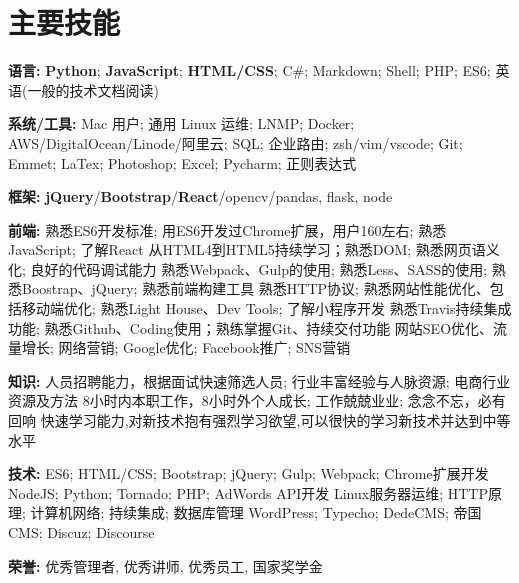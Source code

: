 \section{\textbf{主要技能}}
\resumeSubHeadingListStart
\item{
  \textbf{语言:}{ \textbf{Python}; \textbf{JavaScript}; \textbf{HTML/CSS}; C\#; Markdown; Shell; PHP; ES6; 英语(一般的技术文档阅读)}
}
\item{
 \textbf{系统/工具:}{ Mac 用户; 通用 Linux 运维; LNMP; Docker; AWS/DigitalOcean/Linode/阿里云; SQL; 企业路由; zsh/vim/vscode; Git; Emmet; LaTex; Photoshop; Excel; Pycharm; 正则表达式}
}
\item{
 \textbf{框架:}{ \textbf{jQuery}/\textbf{Bootstrap}/\textbf{React}/opencv/pandas, flask, node}
}
\item{
  \textbf{前端:}{
    \resumeItemListStart
       {熟悉ES6开发标准; 用ES6开发过Chrome扩展，用户160左右; 熟悉JavaScript; 了解React}
       {从HTML4到HTML5持续学习；熟悉DOM; 熟悉网页语义化; 良好的代码调试能力}
       {熟悉Webpack、Gulp的使用; 熟悉Less、SASS的使用; 熟悉Boostrap、jQuery; 熟悉前端构建工具}
       {熟悉HTTP协议; 熟悉网站性能优化、包括移动端优化; 熟悉Light House、Dev Tools; 了解小程序开发}
       {熟悉Travis持续集成功能; 熟悉Github、Coding使用；熟练掌握Git、持续交付功能}
       {网站SEO优化、流量增长; 网络营销; Google优化; Facebook推广; SNS营销}
   \resumeItemListEnd
  }
}
\item{
  \textbf{知识:}{
    \resumeItemListStart
       {人员招聘能力，根据面试快速筛选人员; 行业丰富经验与人脉资源; 电商行业资源及方法}
       {8小时内本职工作，8小时外个人成长; 工作兢兢业业; 念念不忘，必有回响}
       {快速学习能力,对新技术抱有强烈学习欲望,可以很快的学习新技术并达到中等水平}
   \resumeItemListEnd
  }
}
\item{
  \textbf{技术:}{
    \resumeItemListStart
       {ES6; HTML/CSS; Bootstrap; jQuery; Gulp; Webpack; Chrome扩展开发}
       {NodeJS; Python; Tornado; PHP; AdWords API开发}
       {Linux服务器运维; HTTP原理; 计算机网络; 持续集成; 数据库管理}
       {WordPress; Typecho; DedeCMS; 帝国 CMS; Discuz; Discourse}
   \resumeItemListEnd
  }
}
\item{
 \textbf{荣誉:}{
  优秀管理者, 优秀讲师, 优秀员工, 国家奖学金
 }
}
\resumeSubHeadingListEnd
